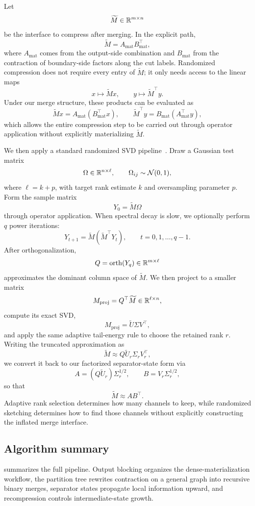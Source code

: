 Let
\[
\widetilde M \in \mathbb{R}^{m \times n}
\]
be the interface to compress after merging. In the explicit path,
\[
\widetilde M = A_{\mathrm{mat}} B_{\mathrm{mat}}^\top,
\]
where $A_{\mathrm{mat}}$ comes from the output-side combination and $B_{\mathrm{mat}}$ from the contraction of boundary-side factors along the cut labels. Randomized compression does not require every entry of $\widetilde M$; it only needs access to the linear maps
\[
x \mapsto \widetilde M x,
\qquad
y \mapsto \widetilde M^\top y.
\]
Under our merge structure, these products can be evaluated as
\[
\widetilde M x = A_{\mathrm{mat}} (B_{\mathrm{mat}}^\top x),
\qquad
\widetilde M^\top y = B_{\mathrm{mat}} (A_{\mathrm{mat}}^\top y),
\]
which allows the entire compression step to be carried out through operator application without explicitly materializing $\widetilde M$.

We then apply a standard randomized SVD pipeline~\cite{halko2011finding}. Draw a Gaussian test matrix
\[
\Omega \in \mathbb{R}^{n \times \ell},
\qquad
\Omega_{ij}\sim\mathcal N(0,1),
\]
where $\ell=k+p$, with target rank estimate $k$ and oversampling parameter $p$. Form the sample matrix
\[
Y_0 = \widetilde M \Omega
\]
through operator application. When spectral decay is slow, we optionally perform $q$ power iterations:
\[
Y_{t+1} = \widetilde M(\widetilde M^\top Y_t),
\qquad
t=0,1,\ldots,q-1.
\]
After orthogonalization,
\[
Q = \mathrm{orth}(Y_q) \in \mathbb{R}^{m \times \ell}
\]
approximates the dominant column space of $\widetilde M$. We then project to a smaller matrix
\[
M_{\mathrm{proj}} = Q^\top \widetilde M \in \mathbb{R}^{\ell \times n},
\]
compute its exact SVD,
\[
M_{\mathrm{proj}} = \widetilde U \Sigma V^\top,
\]
and apply the same adaptive tail-energy rule to choose the retained rank $r$. Writing the truncated approximation as
\[
\widetilde M \approx Q\widetilde U_r \Sigma_r V_r^\top,
\]
we convert it back to our factorized separator-state form via
\[
A = (Q\widetilde U_r)\Sigma_r^{1/2},
\qquad
B = V_r \Sigma_r^{1/2},
\]
so that
\[
\widetilde M \approx AB^\top.
\]
Adaptive rank selection determines how many channels to keep, while randomized sketching determines how to find those channels without explicitly constructing the inflated merge interface.

\subsection{Algorithm summary}

 summarizes the full pipeline. Output blocking organizes the dense-materialization workflow, the partition tree rewrites contraction on a general graph into recursive binary merges, separator states propagate local information upward, and recompression controls intermediate-state growth.

